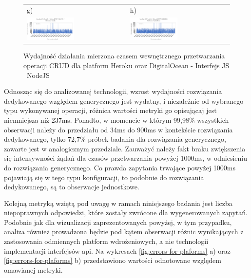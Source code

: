 \begin{figure}[htb]
\begin{tabular}{@{}ll@{}}
    g) & h) \\
    \includegraphics[width=0.49\textwidth]{rys05/nodejs-delete-heroku.pdf} & \includegraphics[width=0.49\textwidth]{rys05/nodejs-delete-digitalocean.pdf} \\
	\end{tabular}
  \caption{Wydajność działania mierzona czasem wewnętrznego przetwarzania operacji CRUD dla platform Heroku oraz DigitalOcean - Interfejs JS \ NodeJS}
  \label{fig:nodejs-heroku-vs-digitalocean}
\end{figure}

Odnosząc się do analizowanej technologii, wzrost wydajności rozwiązania dedykowanego względem generycznego jest wydatny, i niezależnie od wybranego typu wykonywanej operacji, różnica wartości metryki go opisującaj jest niemniejsza niż 237ms. Ponadto, w momencie w którym 99,98\% wszystkich obserwacji należy do przedziału od 34ms do 900ms w kontekście rozwiązania dedykowanego, tylko 72,7\% próbek badania dla rozwiązania generycznego, zawarte jest w analogicznym przedziale. Zauważyć należy fakt braku zwiększenia się intensywności żądań dla czasów przetwarzania powyżej 1000ms, w odniesieniu do rozwiązania generycznego. Co prawda zapytania trwające powyżej 1000ms pojawiają się w tego typu konfiguracji, to podobnie do rozwiązania dedykowanego, są to obserwacje jednostkowe.  

Kolejną metryką wziętą pod uwagę w ramach niniejszego badania jest liczba niepoprawnych odpowiedzi, które zostały zwrócone dla wygenerowanych zapytań. Podobnie jak dla wizualizacji zaprezentowanych powyżej, w tym przypadku, analiza również prowadzona będzie pod kątem obserwacji różnic wynikających z zastosowania odmiennych platform wdrożeniowych, a nie technologii implementacji interfejsów api. Na wykresach \ref{fig:errors-for-plaforms} a) oraz \ref{fig:errors-for-plaforms} b) przedstawiono wartości odnotowane względem omawianej metryki.


